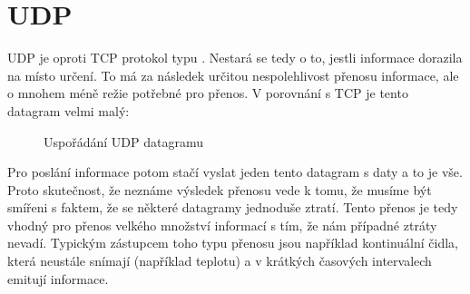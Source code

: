\section{UDP}
UDP je oproti TCP protokol typu . Nestará se tedy o to, jestli informace dorazila na místo určení. To má za následek určitou nespolehlivost přenosu informace, ale o mnohem méně režie potřebné pro přenos. V porovnání s TCP je tento datagram velmi malý:

\begin{figure}[H]
    \centering
	\caption{Uspořádání UDP datagramu}
	\label{fig:tcp-packet}
\end{figure}

Pro poslání informace potom stačí vyslat jeden tento datagram s daty a to je vše. Proto skutečnost, že neznáme výsledek přenosu vede k tomu, že musíme být smířeni s faktem, že se některé datagramy jednoduše ztratí. Tento přenos je tedy vhodný pro přenos velkého množství informací s tím, že nám případné ztráty nevadí. Typickým zástupcem toho typu přenosu jsou například kontinuální čidla, která neustále snímají (například teplotu) a v krátkých časových intervalech emitují informace.